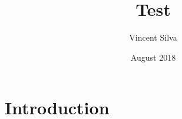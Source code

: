 \documentclass{article}
\title{Test}
\author{Vincent Silva}
\date{August 2018}
\begin{document}
\maketitle

\section{Introduction}
\end{document}

